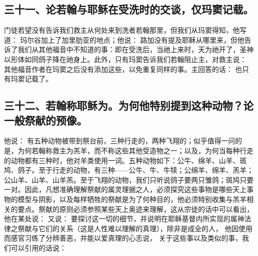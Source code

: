 \subsection{三十一、论若翰与耶稣在受洗时的交谈，仅玛窦记载。}

门徒若望没有告诉我们救主从何处来到洗者若翰那里，但我们从玛窦得知，他写道： 玛尔谷加上了加里肋亚的地点；他说： 路加没有提及耶稣从哪里来，但他告诉了我们从其他福音中不知道的事：即在受洗后，当祂上来时，天为祂开了，圣神以形体如同鸽子降在祂身上。此外，只有玛窦告诉我们若翰阻止主，对救主说： 其他福音作者在玛窦之后没有添加这些，以免重复同样的事。主回答的话： 也只有玛窦记载了。\par


\subsection{三十二、若翰称耶稣为。为何他特别提到这种动物？论一般祭献的预像。}

他说：  有五种动物被带到祭台前，三种行走的，两种飞翔的；似乎值得一问的是，为何若翰称救主为羔羊，而不称这些其他受造物之一；以及，为何当每种行走的动物都有三种时，他对羊类使用一词。五种动物如下：公牛、绵羊、山羊、斑鸠、鸽子。至于行走的动物，有三种——公牛、牛、牛犊；公绵羊、绵羊、羔羊；公山羊、山羊、山羊羔。至于飞翔的动物，我们只听说鸽子要两只雏鸽；斑鸠只要一对。因此，凡想准确理解祭献的属灵理据之人，必须探究这些事物是哪些天上事物的模型与阴影，以及每样牺牲的祭献是为了何种目的，他必须特别收集与羔羊相关的要点。祭献的原则必须参照某些天上奥迹来理解，这从宗徒的话中可以看出，他在某处说： 又说： 要探讨这一切的细节，并说明在耶稣基督内所实现的属神法律之祭献与它们的关系（这是人性难以理解的真理），除非是成全的人， 他因使用而感官习练了分辨善恶，并能以爱真理的心志说，  关于这些事以及类似的事，我们可以引用的话说：\par

